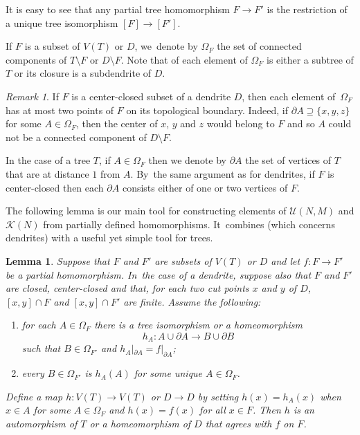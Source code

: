\documentclass[JEP,XML,SOM,Unicode,NoFloatCountersInSection,published]{cedram}
\theoremstyle{plain}
\newtheorem{lemma}[theorem]{Lemma}
\theoremstyle{definition}
\theoremstyle{remark}
\newtheorem{remark}[theorem]{Remark}
\newcommand{\U}{\mathcal{U}}
\newcommand{\K}{\mathcal{K}}
\begin{document}
It is easy to see that any partial tree homomorphism $F \to F'$ is the restriction of a unique tree isomorphism $[F] \to [F']$.

If $F$ is a subset of $V(T)$ or $D$, we~denote by $\Omega_F$ the set of connected components of $T \setminus F$ or $D \setminus F$.
Note that of each element of $\Omega_F$ is either a subtree of $T$ or its closure is a subdendrite of $D$.

\begin{remark}
\label{rmk.boundary.omega.F}
If $F$ is a center-closed subset of a dendrite $D$, then each element of~$\Omega_F$ has at most two points of $F$ on its topological boundary.
Indeed, if $\partial A \supseteq \{x,y,z\}$ for some $A \in \Omega_F$, then the center of $x$, $y$ and $z$ would belong to $F$ and so $A$ could not be a connected component of $D \setminus F$.

In the case of a tree $T$, if $A \in \Omega_F$ then we denote by $\partial A$ the set of vertices of $T$ that are at distance $1$ from $A$. By~the same argument as for dendrites, if $F$ is center-closed then each $\partial A$ consists either of one or two vertices of $F$.
\end{remark}

The following lemma is our main tool for constructing elements of $\U(N,M)$ and $\K(N)$ from partially defined homomorphisms. It~combines \cite[Lem.\,4.3]{Kaleidoscopic} (which concerns dendrites) with a useful yet simple tool for trees.

\begin{lemma}
\label{lem.patchwork}
Suppose that $F$ and $F'$ are subsets of $V(T)$ or $D$ and let $f \colon F \to F'$ be a partial homomorphism. In~the case of a dendrite, suppose also that $F$ and $F'$ are closed, center-closed and that, for each two cut points $x$ and $y$ of $D$, $[x,y] \cap F$ and $[x,y] \cap F'$ are finite.
Assume the following:
\begin{enumerate}
\item for each $A \in \Omega_F$ there is a tree isomorphism or a homeomorphism
\[
h_A \colon A \cup \partial A \to B \cup \partial B
\]
such that $B \in \Omega_{F'}$ and $h_A|_{\partial A} = f|_{\partial A}$;
\item every $B \in \Omega_{F'}$ is $h_A(A)$ for some unique $A \in \Omega_F$.
\end{enumerate}
Define a map $h \colon V(T) \to V(T)$ or $D \to D$ by setting $h(x) = h_A(x)$ when $x \in A$ for some $A \in \Omega_F$ and $h(x) = f(x)$ for all $x \in F$.
Then $h$ is an automorphism of $T$ or a homeomorphism of $D$ that agrees with $f$ on $F$.
\end{lemma}
\end{document}
